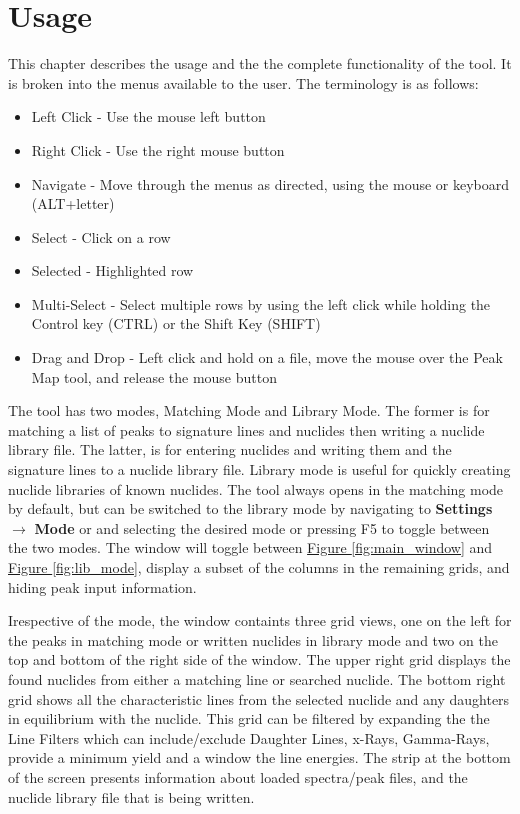 \documentclass[12pt,report,justified]{SANDreport}
\begin{document}
    \chapter{Usage} \label{sec:usage}
    This chapter describes the usage and the the complete functionality of the tool. It is broken into
    the menus available to the user. The terminology is as follows:
    \begin{itemize}
        \item Left Click - Use the mouse left button
        \item Right Click - Use the right mouse button
        \item Navigate - Move through the menus as directed, using the mouse or keyboard (ALT+letter)
        \item Select - Click on a row
        \item Selected - Highlighted row
        \item Multi-Select - Select multiple rows by using the left click while holding the Control key (CTRL) or the Shift Key (SHIFT)\
        \item Drag and Drop - Left click and hold on a file, move the mouse over the Peak Map tool, and release the mouse button
    \end{itemize}
The tool has two modes, Matching Mode and Library Mode. The former is for matching a list of
peaks to signature lines and nuclides then writing a nuclide library file. The latter, is for entering
nuclides and writing them and the signature lines to a nuclide library file. Library mode is useful
for quickly creating nuclide libraries of known nuclides. The tool always opens in the matching
mode by default, but can be switched to the library mode by navigating to \textbf{Settings} 
\(\rightarrow\) \textbf{Mode} or and selecting the desired mode or pressing F5 to toggle between the 
two modes. The window will toggle between \hyperref[fig:main_window]{Figure \ref{fig:main_window}} 
and \hyperref[fig:lib_mode]{Figure \ref{fig:lib_mode}}, display a subset of the columns in the 
remaining grids, and hiding peak input information.

Irespective of the mode, the window containts three grid views, one on the left for the peaks in 
matching mode or written nuclides in library mode and two on the top and bottom of the right side 
of the window. The upper right grid displays the found nuclides from either a matching line or searched 
nuclide. The bottom right grid shows all the characteristic lines from the selected nuclide and any 
daughters in equilibrium with the nuclide. This grid can be filtered by expanding the the Line Filters 
which can include/exclude Daughter Lines, x-Rays, Gamma-Rays, provide a minimum yield and a window the 
line energies. The strip at the bottom of the screen presents information about loaded spectra/peak 
files, and the nuclide library file that is being written.
\end{document}
